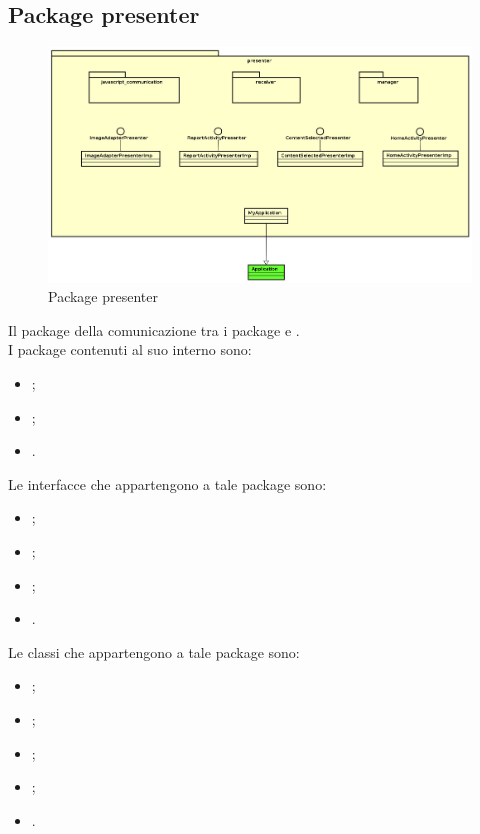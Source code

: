\documentclass[../Tesi.tex]{subfiles}
\begin{document}
	\subsection{Package presenter}
		\begin{figure}[H]
			\centering
			\includegraphics[scale=0.4]{images/package_diagrams/presenter}
				\caption{Package presenter}
			\label{fig:StrutturaMVP}
		\end{figure}
		Il package  della comunicazione tra i package  e . \\
		I package contenuti al suo interno sono:
		\begin{itemize}
			\item {};
			\item {};
			\item {}.
		\end{itemize}
		Le interfacce che appartengono a tale package sono:
		\begin{itemize}
			\item {};
			\item {};
			\item {};
			\item {}.
		\end{itemize}
		Le classi che appartengono a tale package sono:
		\begin{itemize}
			\item {};
			\item {};
			\item {};
			\item {};
			\item {}.
		\end{itemize}
\end{document}
